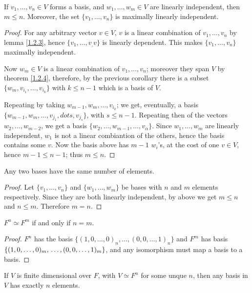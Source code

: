\begin{lemma}
    If $ v_1, \dots, v_n \in V$ forms a basis, and $ w_1, \dots, w_m \in V$ are
    linearly independent, then $m \leq n$. Moreover, the set $\{v_1, \dots,
    v_n\}$ is maximally linearly independent.
\end{lemma}
\begin{proof}
    For any arbitrary vector $v \in V$,  $v$ is a linear combination of  $ v_1,
    \dots, v_n$ by lemma \ref {1.2.3}, hence $\{v_1, \dots, v_,v\}$ is linearly
    dependent. This makes $\{v_1, \dots, v_n\}$ maximally independent.

    Now $w_m \in V$ is a linear combination of  $ v_1, \dots, v_n$; moreover
    they span $V$ by theorem \ref{1.2.4}, therefore, by the previous corollary
    there is a subset $\{w_m,v_{i_1}, \dots, v_{i_k}\}$ with $k \leq n-1$ which
    is a basis of  $V$.

    Repeating by taking  $w_{m-1},w_m, \dots, v_{i_k}$; we get, eventually, a
    basis $\{w_{m-1},w_m, \dots, v_{j_1}, dots, v_{j_s}\}$, with $s \leq n-1$.
    Repeating then of the vectors  $ w_2, \dots, w_{m-2}$, we get a basis
    $\{w_2,\dots, w_{m-1}, \dots, v_\alpha\}$. Since $ w_1, \dots, w_m$ are
    linearly independent, $ w_1$ is not a linear combiantion of the others,
    hence the basis contains some $v$. Now the basis above has  $m-1$  $w_i$'s,
    at the cost of one  $v \in V$, hence  $m-1 \leq n-1$; thus  $m \leq n$.
\end{proof}
\begin{corollary}
    Any two bases have the same number of elements.
\end{corollary}
\begin{proof}
    Let $\{v_1, \dots, v_n\}$ and $\{w_1, \dots, w_m\}$ be bases with $n$ and
    $m$ elements respectively. Since they are both linearly independent, by
    above we get  $m \leq n$ and  $n 
    \leq m$. Therefore  $m=n$.
\end{proof}
\begin{corollary}
    $F^n \simeq F^m$ if and only if  $n=m$.
\end{corollary}
\begin{proof}
    $F^n$ has the basis  $\{(1,0, \dots, 0)_n, \dots, (0,0, \dots, 1)_n\}$ and
    $F^m$ has basis $\{(1,0, \dots, 0)_m, \\ \dots, (0,0, \dots, 1)_m\}$, and any
    isomorphism must map a basis to a basis.
\end{proof}
\begin{corollary}
    If $V$ is finite dimensional over  $F$, with  $V \simeq F^n$ for some unque
     $n$, then  any basis in $V$ has exactly  $n$ elements.
\end{corollary}

